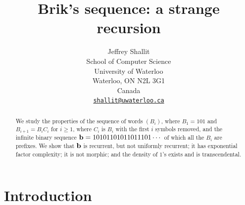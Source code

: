 \documentclass[12pt,reqno]{article}
\begin{document}
\title{Brik's sequence:  a strange recursion}

\author{Jeffrey Shallit\\
School of Computer Science\\
University of Waterloo\\
Waterloo, ON  N2L 3G1 \\
Canada\\
\href{mailto:shallit@uwaterloo.ca}{\tt shallit@uwaterloo.ca}}

\maketitle

\theoremstyle{plain}
\newtheorem{theorem}{Theorem}
\newtheorem{corollary}[theorem]{Corollary}
\newtheorem{lemma}[theorem]{Lemma}
\newtheorem{proposition}[theorem]{Proposition}

\theoremstyle{definition}
\newtheorem{definition}[theorem]{Definition}
\newtheorem{example}[theorem]{Example}
\newtheorem{conjecture}[theorem]{Conjecture}

\theoremstyle{remark}
\newtheorem{remark}[theorem]{Remark}

\def\Enn{\mathbb{N}}

\begin{abstract}
We study the properties of the sequence of words $(B_i)$,
where $B_1 = 101$ and $B_{i+1} = B_i C_i$ for $i \geq 1$, where
$C_i$ is $B_i$ with the first $i$ symbols removed, and
the infinite binary sequence ${\bf b} = 10101101011011101 \cdots$
of which all the $B_i$ are prefixes.
We show that $\bf b$ is recurrent, but not uniformly recurrent; it has
exponential factor complexity; it is not morphic; and the density of $1$'s
exists and is transcendental.
\end{abstract}

\section{Introduction}
\end{document}
